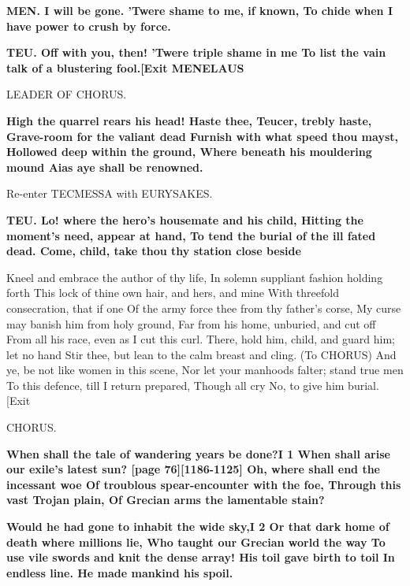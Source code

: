 \documentclass[11pt,letter]{book}
\begin{document}
\par \textbf{MEN. I will be gone. ’Twere shame to me, if known, To chide when I have power to crush by force.}
\par 

\par \textbf{TEU. Off with you, then! ’Twere triple shame in me To list the vain talk of a blustering fool.[Exit MENELAUS}
\par 

\par  LEADER OF CHORUS.

\par \textbf{High the quarrel rears his head! Haste thee, Teucer, trebly haste, Grave-room for the valiant dead Furnish with what speed thou mayst, Hollowed deep within the ground, Where beneath his mouldering mound Aias aye shall be renowned.}
\par 

\par  Re-enter TECMESSA with EURYSAKES.

\par \textbf{TEU. Lo! where the hero’s housemate and his child, Hitting the moment’s need, appear at hand, To tend the burial of the ill fated dead. Come, child, take thou thy station close beside}
\par   Kneel and embrace the author of thy life, In solemn suppliant fashion holding forth This lock of thine own hair, and hers, and mine With threefold consecration, that if one Of the army force thee from thy father’s corse, My curse may banish him from holy ground, Far from his home, unburied, and cut off From all his race, even as I cut this curl. There, hold him, child, and guard him; let no hand Stir thee, but lean to the calm breast and cling. (To CHORUS) And ye, be not like women in this scene, Nor let your manhoods falter; stand true men To this defence, till I return prepared, Though all cry No, to give him burial. [Exit

\par  CHORUS.

\par \textbf{When shall the tale of wandering years be done?I 1 When shall arise our exile’s latest sun? [page 76][1186-1125] Oh, where shall end the incessant woe Of troublous spear-encounter with the foe, Through this vast Trojan plain, Of Grecian arms the lamentable stain?}
\par 

\par \textbf{Would he had gone to inhabit the wide sky,I 2 Or that dark home of death where millions lie, Who taught our Grecian world the way To use vile swords and knit the dense array! His toil gave birth to toil In endless line. He made mankind his spoil.}
\par 
\end{document}
